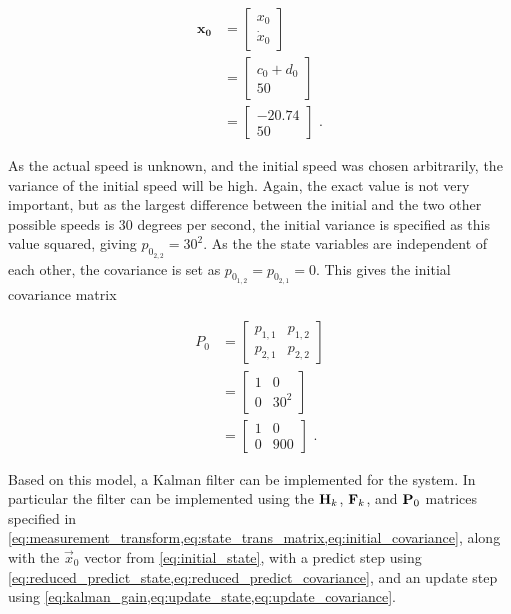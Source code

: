 \begin{equation}
\label{eq:initial_state}
\begin{split}
    \mathbf{x_0} &=
    \begin{bmatrix}
      x_0 \\
      \dot{x}_0 
    \end{bmatrix}
    \\
    &=
    \begin{bmatrix}
      c_0+d_0 \\
      50
    \end{bmatrix}
    \\
    &=
    \begin{bmatrix}
      -20.74 \\
      50
    \end{bmatrix}
    \text{ .}
\end{split}
\end{equation}

As the actual speed is unknown, and the initial speed was chosen arbitrarily, the variance of the initial speed will be high. Again, the exact value is not very important, but as the largest difference between the initial and the two other possible speeds is $30$ degrees per second, the initial variance is specified as this value squared, giving $p_{0_{2, 2}} = 30^2$. As the the state variables are independent of each other, the covariance is set as $p_{0_{1,2}}=p_{0_{2,1}}=0$. This gives the initial covariance matrix

\begin{equation}
\label{eq:initial_covariance}
\begin{split}
    P_0 &=
    \begin{bmatrix}
      p_{1,1} & p_{1,2} \\
      p_{2,1} & p_{2,2}
    \end{bmatrix}
    \\
    &=
    \begin{bmatrix}
      1 & 0 \\
      0 & 30^2
    \end{bmatrix}
    \\
    &=
    \begin{bmatrix}
      1 & 0 \\
      0 & 900
    \end{bmatrix}
    \text{ .}
\end{split}
\end{equation}

Based on this model, a Kalman filter can be implemented for the system. In particular the filter can be implemented using the $\mathbf{H}_k$, $\mathbf{F}_k$, and $\mathbf{P}_0$ matrices specified in \cref{eq:measurement_transform,eq:state_trans_matrix,eq:initial_covariance}, along with the $\vec{x}_0$ vector from \cref{eq:initial_state}, with a predict step using \cref{eq:reduced_predict_state,eq:reduced_predict_covariance}, and an update step using \cref{eq:kalman_gain,eq:update_state,eq:update_covariance}.